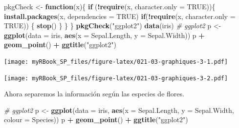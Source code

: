 \documentclass[
]{book}
\newenvironment{Shaded}{\begin{snugshade}}{\end{snugshade}}
\newcommand{\CommentTok}[1]{\textcolor[rgb]{0.56,0.35,0.01}{\textit{#1}}}
\newcommand{\ControlFlowTok}[1]{\textcolor[rgb]{0.13,0.29,0.53}{\textbf{#1}}}
\newcommand{\DataTypeTok}[1]{\textcolor[rgb]{0.13,0.29,0.53}{#1}}
\newcommand{\DecValTok}[1]{\textcolor[rgb]{0.00,0.00,0.81}{#1}}
\newcommand{\KeywordTok}[1]{\textcolor[rgb]{0.13,0.29,0.53}{\textbf{#1}}}
\newcommand{\NormalTok}[1]{#1}
\newcommand{\OperatorTok}[1]{\textcolor[rgb]{0.81,0.36,0.00}{\textbf{#1}}}
\newcommand{\OtherTok}[1]{\textcolor[rgb]{0.56,0.35,0.01}{#1}}
\newcommand{\StringTok}[1]{\textcolor[rgb]{0.31,0.60,0.02}{#1}}
\begin{document}
\begin{Shaded}
\begin{Highlighting}[]
\NormalTok{pkgCheck <-}\StringTok{ }\ControlFlowTok{function}\NormalTok{(x)\{ }
    \ControlFlowTok{if}\NormalTok{ (}\OperatorTok{!}\KeywordTok{require}\NormalTok{(x, }\DataTypeTok{character.only =} \OtherTok{TRUE}\NormalTok{))\{}
        \KeywordTok{install.packages}\NormalTok{(x, }\DataTypeTok{dependencies =} \OtherTok{TRUE}\NormalTok{)}
        \ControlFlowTok{if}\NormalTok{(}\OperatorTok{!}\KeywordTok{require}\NormalTok{(x, }\DataTypeTok{character.only =} \OtherTok{TRUE}\NormalTok{)) \{}
            \KeywordTok{stop}\NormalTok{()}
\NormalTok{        \}}
\NormalTok{    \}}
\NormalTok{\}}
\KeywordTok{pkgCheck}\NormalTok{(}\StringTok{"ggplot2"}\NormalTok{)}
\KeywordTok{data}\NormalTok{(iris)}
\CommentTok{# ggplot2}
\NormalTok{p <-}\StringTok{ }\KeywordTok{ggplot}\NormalTok{(}\DataTypeTok{data =}\NormalTok{ iris, }\KeywordTok{aes}\NormalTok{(}\DataTypeTok{x =}\NormalTok{ Sepal.Length, }\DataTypeTok{y =}\NormalTok{ Sepal.Width))}
\NormalTok{p }\OperatorTok{+}\StringTok{ }\KeywordTok{geom_point}\NormalTok{() }\OperatorTok{+}\StringTok{ }\KeywordTok{ggtitle}\NormalTok{(}\StringTok{"ggplot2"}\NormalTok{)}
\end{Highlighting}
\end{Shaded}

\texttt{[image: myRBook\_SP\_files/figure-latex/021-03-graphiques-3-1.pdf]}

\begin{Shaded}
\end{Shaded}

\texttt{[image: myRBook\_SP\_files/figure-latex/021-03-graphiques-3-2.pdf]}

Ahora separemos la información según las especies de flores.

\begin{Shaded}
\begin{Highlighting}[]
\CommentTok{# ggplot2}
\NormalTok{p <-}\StringTok{ }\KeywordTok{ggplot}\NormalTok{(}\DataTypeTok{data =}\NormalTok{ iris, }\KeywordTok{aes}\NormalTok{(}\DataTypeTok{x =}\NormalTok{ Sepal.Length, }\DataTypeTok{y =}\NormalTok{ Sepal.Width, }\DataTypeTok{colour =}\NormalTok{ Species))}
\NormalTok{p }\OperatorTok{+}\StringTok{ }\KeywordTok{geom_point}\NormalTok{() }\OperatorTok{+}\StringTok{ }\KeywordTok{ggtitle}\NormalTok{(}\StringTok{"ggplot2"}\NormalTok{)}
\end{Highlighting}
\end{Shaded}
\end{document}
